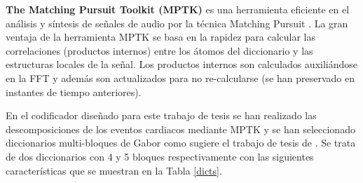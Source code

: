 \textbf{The Matching Pursuit Toolkit (MPTK)} es una herramienta eficiente en el análisis y síntesis de señales de audio por la técnica Matching Pursuit \cite[]{Krstulovic2006}. La gran ventaja de la herramienta MPTK se basa en la rapidez para calcular las correlaciones (productos internos) entre los átomos del diccionario y las estructuras locales de la señal. Los productos internos son calculados auxiliándose en la FFT y además son actualizados para no re-calcularse (se han preservado en instantes de tiempo anteriores).

En el codificador diseñado para este trabajo de tesis se han realizado las descomposiciones de los eventos cardiacos mediante MPTK y se han seleccionado diccionarios multi-bloques de Gabor como sugiere el trabajo de tesis de \cite{Nieblas2014}. Se trata de dos diccionarios con 4 y 5 bloques respectivamente con las siguientes características que se muestran en la Tabla \ref{dicts}.
